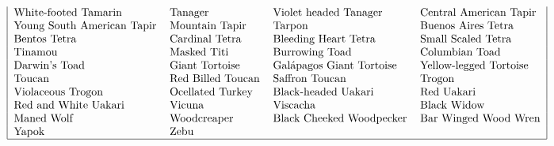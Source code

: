 \[\begin{tabular}{|llll|}
White-footed Tamarin  & Tanager   & Violet headed Tanager   & Central American Tapir \\
Young South American Tapir   & Mountain Tapir   & Tarpon  & Buenos Aires Tetra  \\
Bentos Tetra   & Cardinal Tetra  & Bleeding Heart Tetra   & Small Scaled Tetra  \\
Tinamou  & Masked Titi   & Burrowing Toad   & Columbian Toad \\
Darwin's Toad   & Giant Tortoise   & Gal\'{a}pagos Giant Tortoise  & Yellow-legged Tortoise  \\
Toucan   & Red Billed Toucan  & Saffron Toucan   & Trogon  \\
Violaceous Trogon  & Ocellated Turkey   & Black-headed Uakari   & Red Uakari \\
Red and White Uakari   & Vicuna   & Viscacha  & Black Widow  \\
Maned Wolf   & Woodcreaper  & Black Cheeked Woodpecker   & Bar Winged Wood Wren  \\
Yapok  & Zebu  &  & \\
\hline
\end{tabular}\]
